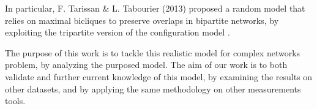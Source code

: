 \documentclass[table]{report}
\begin{document}
\medbreak

In particular, F. Tarissan \& L. Tabourier (2013) proposed a random model that relies on maximal bicliques to preserve overlaps in bipartite networks, by exploiting the tripartite version of the configuration model \cite{fabien_lionel}\cite{coupechoux}.

\medbreak

The purpose of this work is to tackle this realistic model for complex networks problem, by analyzing the purposed model. The aim of our work is to both validate and further current knowledge of this model, by examining the results on other datasets, and by applying the same methodology on other measurements tools. 



%
%
%
%
%
%
%
%
%
%
%
%
%
%
%
%
\end{document}
